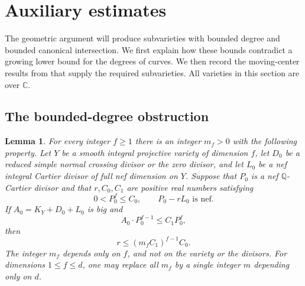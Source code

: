 \documentclass[12pt,a4paper,psamsfonts]{amsart}
\theoremstyle{definition}
\theoremstyle{plain}
\newtheorem{lemma}{Lemma}[section]
\newcommand{\C}{\mathbb C}
\begin{document}
\section{Auxiliary estimates}
\label{sec:jet-tools}

The geometric argument will produce subvarieties with bounded degree and
bounded canonical intersection.  We first explain how these bounds
contradict a growing lower bound for the degrees of curves.  We then
record the moving-center results from \cite{LA} that supply the required
subvarieties.  All varieties in this section are over $\C$.

\subsection{The bounded-degree obstruction}

\begin{lemma}
\label{lemma:bounded-curves}
For every integer $f\geq1$ there is an integer $m_f>0$ with the
following property.  Let $Y$ be a smooth integral projective variety
of dimension $f$, let $D_0$ be a reduced simple normal crossing divisor
or the zero divisor, and let $L_0$ be a nef integral Cartier divisor
of full nef dimension on $Y$.  Suppose that $P_0$ is a nef $\mathbb{Q}$-Cartier divisor and that $r,C_0,C_1$ are positive real numbers satisfying
\[
 0<P_0^f\leq C_0,\qquad P_0-rL_0\text{ is nef}.
\]
If $A_0=K_Y+D_0+L_0$ is big and
\begin{equation}
\label{j:adjoint-ratio}
 A_0\cdot P_0^{f-1}\leq C_1P_0^f,
\end{equation}
then
\begin{equation}
\label{j:bounded-curve-obstruction}
 r\leq(m_fC_1)^{f-1}C_0.
\end{equation}
The integer $m_f$ depends only on $f$, and not on the variety or
the divisors.  For dimensions $1\leq f\leq d$, one may replace all
$m_f$ by a single integer $m$ depending only on $d$.
\end{lemma}
\end{document}
